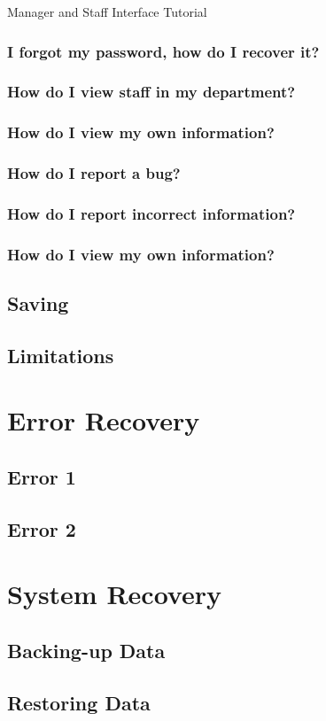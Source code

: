 Manager and Staff Interface Tutorial

\subsubsection{I forgot my password, how do I recover it?}

\subsubsection{How do I view staff in my department?}

\subsubsection{How do I view my own information?}

\subsubsection{How do I report a bug?}

\subsubsection{How do I report incorrect information?}

\subsubsection{How do I view my own information?}

\subsection{Saving}

\subsection{Limitations}

\section{Error Recovery}

\subsection{Error 1}

\subsection{Error 2}

\section{System Recovery}

\subsection{Backing-up Data}

\subsection{Restoring Data}